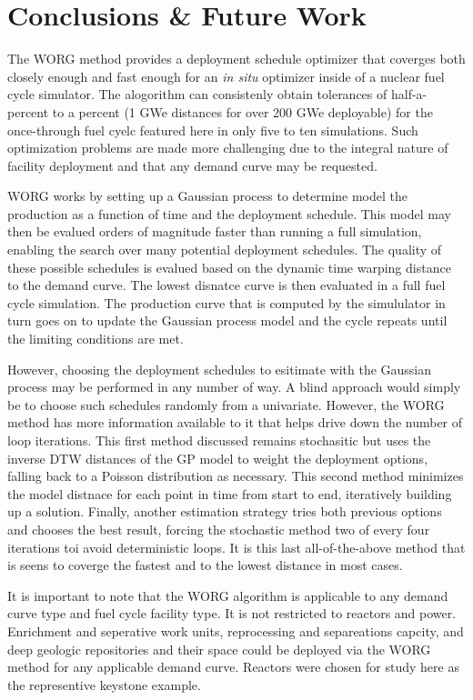 \section{Conclusions \& Future Work}
\label{conclusion}

The WORG method provides a deployment schedule optimizer that coverges 
both closely enough and fast enough for an \emph{in situ} optimizer inside
of a nuclear fuel cycle simulator. The alogorithm can consistenly obtain
tolerances of half-a-percent to a percent (1 GWe distances for over 200 GWe
deployable) for the once-through fuel cyelc featured here in only five to 
ten simulations. Such optimization problems are made
more challenging due to the integral nature of facility deployment and
that any demand curve may be requested.

WORG works by setting up a Gaussian process to determine model the production
as a function of time and the deployment schedule. This model may then
be evalued orders of magnitude faster than running a full simulation, enabling
the search over many potential deployment schedules. The quality of these
possible schedules is evalued based on the dynamic time warping distance
to the demand curve. The lowest disnatce curve is then evaluated in a
full fuel cycle simulation. The production curve that is computed by the 
simululator in turn goes on to update the Gaussian process model and the
cycle repeats until the limiting conditions are met.

However, choosing the deployment schedules to esitimate with the Gaussian
process may be performed in any number of way. A blind approach would
simply be to choose such schedules randomly from a univariate. However, 
the WORG method has more information available to it that helps drive 
down the number of loop iterations. This first method discussed remains 
stochasitic but uses the inverse DTW distances of the GP model to 
weight the deployment options, falling back to a Poisson distribution as 
necessary. This second method minimizes the model distnace for each point 
in time from start to end, iteratively building up a solution. Finally, 
another estimation strategy tries both previous options and chooses the 
best result, forcing the stochastic method two of every four iterations 
toi avoid deterministic loops.  It is this last all-of-the-above method 
that is seens to coverge the fastest and to the lowest distance in most 
cases.

It is important to note that the WORG algorithm is applicable to any 
demand curve type and fuel cycle facility type. It is not restricted to 
reactors and power.  Enrichment and seperative work units, reprocessing
and separeations capcity, and deep geologic repositories and their
space could be deployed via the WORG method for any applicable demand 
curve.  Reactors were chosen for study here as the representive keystone 
example.

